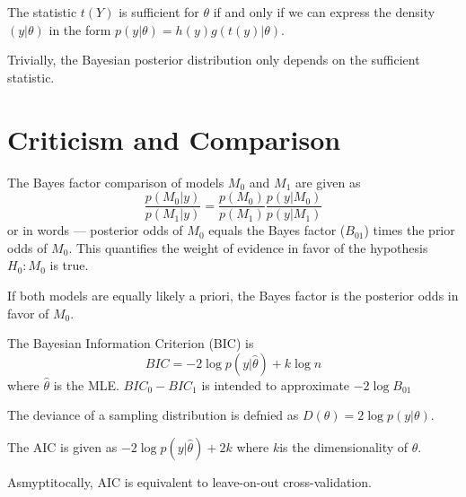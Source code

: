 \begin{thm}
  \label{sec:sampl-prop-relat-5}
  The statistic $t(Y)$ is sufficient for $\theta$ if and only if we
  can express the density $(y | \theta)$ in the form $p(y | \theta) = 
  h(y) g(t(y) | \theta)$.

  Trivially, the Bayesian posterior distribution only depends on the
  sufficient statistic.
\end{thm}

\section{Criticism and Comparison}
\label{sec:criticism-comparison}

\begin{defn}
  \label{sec:criticism-comparison-1}
  The Bayes factor comparison of models $M_{0}$ and $M_{1}$ are given
  as
  \begin{equation}
    \label{eq:19}
    \frac{p(M_{0} | y)}{p(M_{1} | y)} = \frac{p(M_{0})}{p(M_{1})}
    \frac{p(y | M_{0})}{p(y | M_{1})}
  \end{equation}
  or in words --- posterior odds of $M_{0}$ equals the Bayes factor ($B_{01}$)
  times the prior odds of $M_{0}$.  This quantifies the weight of
  evidence in favor of the hypothesis $H_{0}: M_{0}$ is true.

  If both models are equally likely a priori, the Bayes factor is the
  posterior odds in favor of $M_{0}$.
\end{defn}

\begin{defn}
  \label{sec:criticism-comparison-2}
  The Bayesian Information Criterion (BIC) is
  \begin{equation}
    \label{eq:20}
    BIC = -2 \log p(y | \hat \theta) + k \log n
  \end{equation} where $\hat \theta$ is the MLE.
  $BIC_{0} - BIC_{1}$ is intended to approximate $-2 \log B_{01}$
\end{defn}

\begin{defn}
  \label{sec:criticism-comparison-3}
  The deviance of a sampling distribution is defnied as $D(\theta) = 2
  \log p(y | \theta)$.
\end{defn}

\begin{defn}
  \label{sec:criticism-comparison-4}
  The AIC is given as $-2 \log p(y | \hat \theta) + 2k$ where $k$is
  the dimensionality of $\theta$.

  Asmyptitocally, AIC is equivalent to leave-on-out cross-validation.
\end{defn}

